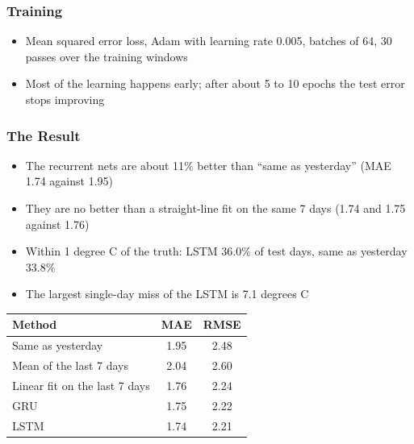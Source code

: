 \begin{frame}[fragile]\frametitle{Training}
\begin{itemize}
\item Mean squared error loss, Adam with learning rate 0.005, batches of 64, 30 passes over the training windows
\item Most of the learning happens early; after about 5 to 10 epochs the test error stops improving
\end{itemize}
\begin{center}
\small
{}
\end{center}
\end{frame}

\begin{frame}[fragile]\frametitle{The Result}
\begin{itemize}
\item The recurrent nets are about 11\% better than ``same as yesterday'' (MAE 1.74 against 1.95)
\item They are no better than a straight-line fit on the same 7 days (1.74 and 1.75 against 1.76)
\item Within 1 degree C of the truth: LSTM 36.0\% of test days, same as yesterday 33.8\%
\item The largest single-day miss of the LSTM is 7.1 degrees C
\end{itemize}
\begin{center}
\small
\begin{tabular}{lcc}
\hline
Method & MAE & RMSE \\
\hline
Same as yesterday & 1.95 & 2.48 \\
Mean of the last 7 days & 2.04 & 2.60 \\
Linear fit on the last 7 days & 1.76 & 2.24 \\
GRU & 1.75 & 2.22 \\
LSTM & 1.74 & 2.21 \\
\hline
\end{tabular}
\end{center}
\end{frame}


